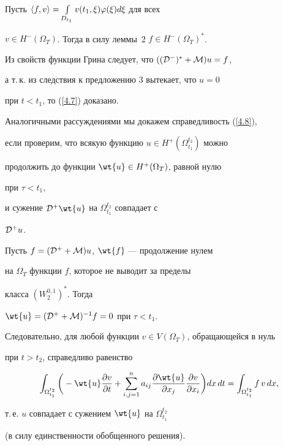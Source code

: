 \begin{pf}


Пусть $\langle f,v\rangle=\int\limits_{D_{t_1}}v(t_1,\xi)\varphi(\xi)d\xi$ для всех


$v\in H^-(\Omega_T)$. Тогда в силу леммы~2\; $f \in H^-(\Omega_T)^*$.


Из свойств функции Грина следует, что $(({\cal D}^-)^* +{\cal M})u=f$,


а т.\,к. из следствия к предложению 3 вытекает, что $u=0$ 


при $t<t_1$, то (\ref{4.7}) доказано.





Аналогичными рассуждениями мы докажем справедливость (\ref{4.8}),


если проверим, что всякую функцию $u\in H^+(\Omega_{t_1}^{t_2})$ можно 


продолжить до функции $\wt{u}\in H^+(\Omega_T)$, равной нулю


при $\tau<t_1$,


и сужение ${\cal D}^+ \wt{u}$ на $\Omega_{t_1}^{t_2}$ совпадает с


${\cal D}^+ u$.


Пусть $f=({\cal D}^+ +{\cal M})u$, $\wt{f}$ --- продолжение нулем 


на $\Omega_T$ функции $f$, которое не выводит за пределы 


класса $(W_2^{0,1})^*$. Тогда 


$\wt{u}=({\cal D}^+ +{\cal M})^{-1}f=0$ при $\tau<t_1$.


Следовательно, для любой функции $v\in V(\Omega_T)$, обращающейся в нуль 


при $t>t_2$, справедливо равенство


$$


\int_{\Omega_{t_1}^{t_2} }


\bigg(-\wt{u} \frac{\partial v}{\partial t}+


\sum_{i,j=1}^n a_{ij}\frac{\partial \wt{u} }{\partial x_j}


\frac{\partial v}{\partial x_i} \bigg)dx\,dt=


\int_{\Omega_{t_1}^{t_2} }f\,v \,dx,


$$


т.\,е. $u$ совпадает с сужением $\wt{u}$ на $\Omega_{t_1}^{t_2}$


(в силу единственности обобщенного решения). 


\end{pf}


